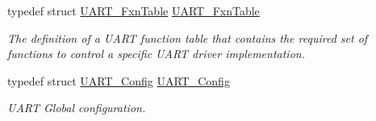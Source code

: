 \begin{DoxyCompactItemize}
typedef struct \hyperlink{struct_u_a_r_t___fxn_table}{U\+A\+R\+T\+\_\+\+Fxn\+Table} \hyperlink{_u_a_r_t_8h_a24d497f125179ba5e5b16ad9a0aa249d}{U\+A\+R\+T\+\_\+\+Fxn\+Table}
\begin{DoxyCompactList}\small\item\em The definition of a U\+A\+R\+T function table that contains the required set of functions to control a specific U\+A\+R\+T driver implementation. \end{DoxyCompactList}\item 
typedef struct \hyperlink{struct_u_a_r_t___config}{U\+A\+R\+T\+\_\+\+Config} \hyperlink{_u_a_r_t_8h_ae513322c7d3184d66173cba9349989a4}{U\+A\+R\+T\+\_\+\+Config}
\begin{DoxyCompactList}\small\item\em U\+A\+R\+T Global configuration. \end{DoxyCompactList}\end{DoxyCompactItemize}
